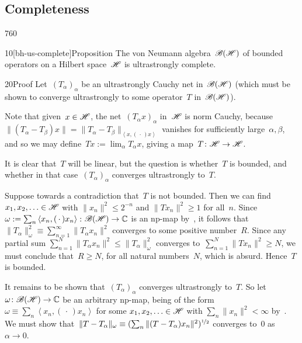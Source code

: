 \subsection{Completeness}
\begin{parsec}{760}%
\begin{point}{10}[bh-us-complete]{Proposition}%
The von Neumann algebra~$\mathscr{B}(\mathscr{H})$
of bounded operators on a Hilbert space~$\mathscr{H}$
is ultrastrongly complete.
\begin{point}{20}{Proof}
Let~$(T_\alpha)_\alpha$ be an ultrastrongly Cauchy net
in~$\mathscr{B}(\mathscr{H})$
(which must be shown to converge ultrastrongly to
some operator~$T$ in~$\mathscr{B}(\mathscr{H})$).

Note that given~$x\in \mathscr{H}$,
the net~$(T_\alpha x)_\alpha$ in~$\mathscr{H}$
is norm Cauchy,
because $\|(T_\alpha-T_\beta) x\|
= \| T_\alpha-T_\beta \|_{\left<x,(\,\cdot\,)x\right>}$
vanishes for sufficiently large~$\alpha,\beta$,
and so we may define~$Tx :=\lim_\alpha T_\alpha x$,
giving a map~$T\colon \mathscr{H}\to\mathscr{H}$.

It is clear that~$T$ will be linear,
but the question is whether~$T$ is bounded,
and whether in that 
case~$(T_\alpha)_\alpha$ converges ultrastrongly to~$T$.

Suppose towards a contradiction that~$T$ is not bounded.
Then we can find~$x_1,x_2,\dotsc\in\mathscr{H}$
with $\|x_n\|^2\leq 2^{-n}$
and $\|Tx_n\|^2\geq 1$ for all~$n$.
Since~$\omega:=\sum_n \left<x_n,(\,\cdot\,)x_n\right>\colon 
\mathscr{B}(\mathscr{H})\to\mathbb{C}$
is an np-map by~, 
it follows that~$\|T_\alpha\|_\omega^2\equiv \sum_{n=1}^\infty 
\|T_\alpha x_n\|^2$
converges to some positive number~$R$.
Since any partial sum $\sum_{n=1}^N \|T_\alpha x_n\|^2
\leq \|T_\alpha\|_\omega^2$
converges to~$\sum_{n=1}^N \|T x_n\|^2\geq N$,
we must conclude that~$R\geq N$,
for all natural numbers~$N$,
which is absurd.
Hence~$T$ is bounded.

It remains to be shown that~$(T_\alpha)_\alpha$
converges ultrastrongly to~$T$.
So let $\omega\colon \mathscr{B}(\mathscr{H})\to\mathbb{C}$ be an arbitrary
np-map,
being of the form~$\omega\equiv \sum_n\left<x_n,(\,\cdot\,)x_n\right>$
for some $x_1,x_2,\dotsc\in\mathscr{H}$ with $\sum_n \|x_n\|^2 <\infty$
by~.
We must show that~$\|T-T_\alpha\|_\omega
\equiv (\sum_n \|(T-T_\alpha)x_n\|^2)^{\nicefrac{1}{2}}$ 
converges to~$0$ as $\alpha\to 0$.


\end{point}
\end{point}
\end{parsec}
